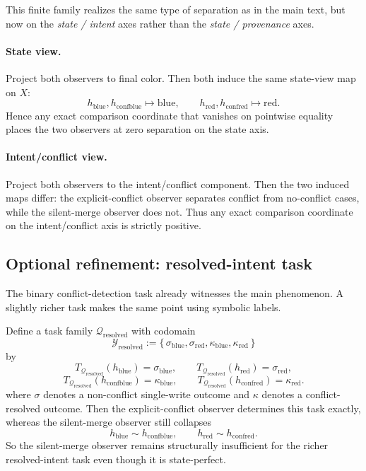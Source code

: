 \documentclass[11pt,twoside]{article}
\theoremstyle{definition}
\newcommand{\blue}{\mathrm{blue}}
\newcommand{\red}{\mathrm{red}}
\newcommand{\conf}{\mathrm{conf}}
\begin{document}
This finite family realizes the same type of separation as in the main text, but now on the \emph{state / intent} axes rather than the \emph{state / provenance} axes.

\paragraph{State view.}
Project both observers to final color. Then both induce the same state-view map on \(X\):
\[
  h_{\blue},h_{\conf\blue}\mapsto \blue,
  \qquad
  h_{\red},h_{\conf\red}\mapsto \red.
\]
Hence any exact comparison coordinate that vanishes on pointwise equality places the two observers at zero separation on the state axis.

\paragraph{Intent/conflict view.}
Project both observers to the intent/conflict component. Then the two induced maps differ: the explicit-conflict observer separates conflict from no-conflict cases, while the silent-merge observer does not. Thus any exact comparison coordinate on the intent/conflict axis is strictly positive.

\subsection{Optional refinement: resolved-intent task}
\label{app:resolved-intent-task}

The binary conflict-detection task already witnesses the main phenomenon. A slightly richer task makes the same point using symbolic labels.

Define a task family \(\mathcal{Q}_{\mathrm{resolved}}\) with codomain
\[
  \mathcal{Y}_{\mathrm{resolved}}
  :=
  \{\,\sigma_{\blue},\sigma_{\red},\kappa_{\blue},\kappa_{\red}\,\}
\]
by
\[
  T_{\mathcal{Q}_{\mathrm{resolved}}}(h_{\blue}) = \sigma_{\blue}, \qquad
  T_{\mathcal{Q}_{\mathrm{resolved}}}(h_{\red}) = \sigma_{\red},
\]
\[
  T_{\mathcal{Q}_{\mathrm{resolved}}}(h_{\conf\blue}) = \kappa_{\blue}, \qquad
  T_{\mathcal{Q}_{\mathrm{resolved}}}(h_{\conf\red}) = \kappa_{\red}.
\]
\noindent where \(\sigma\) denotes a non-conflict single-write outcome and \(\kappa\) denotes a conflict-resolved outcome.
Then the explicit-conflict observer determines this task exactly, whereas the silent-merge observer still collapses
\[
  h_{\blue}\sim h_{\conf\blue},
  \qquad
  h_{\red}\sim h_{\conf\red}.
\]
So the silent-merge observer remains structurally insufficient for the richer resolved-intent task even though it is state-perfect.
\end{document}
